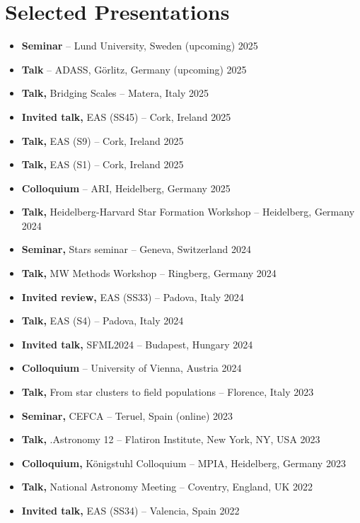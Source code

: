\section*{Selected Presentations}

\begin{itemize}
    \item \textbf{Seminar} -- Lund University, Sweden \hfill (upcoming) 2025
    \item \textbf{Talk} -- ADASS, Görlitz, Germany \hfill (upcoming) 2025
    \item \textbf{Talk,} Bridging Scales -- Matera, Italy \hfill 2025
    \item \textbf{Invited talk,} EAS (SS45) -- Cork, Ireland \hfill 2025
    \item \textbf{Talk,} EAS (S9) -- Cork, Ireland \hfill 2025
    \item \textbf{Talk,} EAS (S1) -- Cork, Ireland \hfill 2025
    \item \textbf{Colloquium} -- ARI, Heidelberg, Germany \hfill 2025
    \item \textbf{Talk,} Heidelberg-Harvard Star Formation Workshop -- Heidelberg, Germany \hfill 2024
    \item \textbf{Seminar,} Stars seminar -- Geneva, Switzerland \hfill 2024
    \item \textbf{Talk,} MW Methods Workshop -- Ringberg, Germany \hfill 2024
    \item \textbf{Invited review,} EAS (SS33) -- Padova, Italy \hfill 2024
    \item \textbf{Talk,} EAS (S4) -- Padova, Italy \hfill 2024
    \item \textbf{Invited talk,} SFML2024 -- Budapest, Hungary \hfill 2024
    \item \textbf{Colloquium}  -- University of Vienna, Austria \hfill 2024
    \item \textbf{Talk,} From star clusters to field populations -- Florence, Italy \hfill 2023
    \item \textbf{Seminar,} CEFCA -- Teruel, Spain (online) \hfill 2023
    \item \textbf{Talk,} .Astronomy 12 -- Flatiron Institute, New York, NY, USA \hfill 2023
    \item \textbf{Colloquium,} Königstuhl Colloquium -- MPIA, Heidelberg, Germany \hfill 2023
    \item \textbf{Talk,} National Astronomy Meeting -- Coventry, England, UK \hfill 2022
    \item \textbf{Invited talk,} EAS (SS34) -- Valencia, Spain \hfill 2022

\end{itemize}
